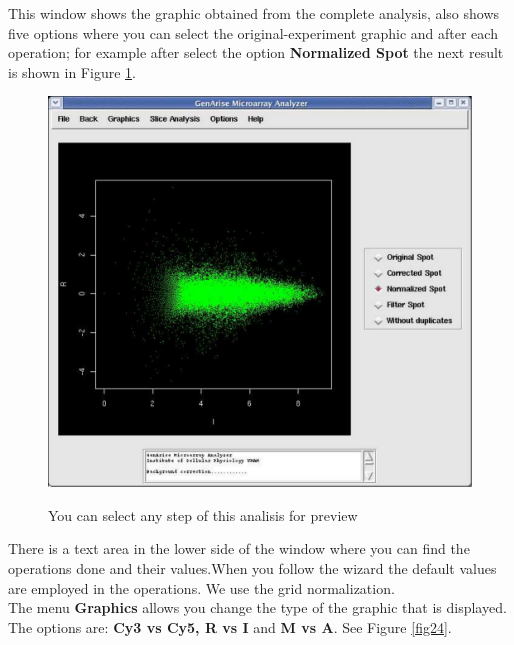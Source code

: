 \documentclass[12pt]{article}
\begin{document}
This window shows the graphic obtained from the complete analysis, also shows five options where you can select the original-experiment graphic and after each operation; for example after select the option \textbf{Normalized Spot} the next result is shown in Figure \ref{fig23}.\\
\begin{figure}[h]
\begin{center}
\includegraphics[scale= 0.3]{./images/wizardNorm.pdf}\\
\caption{You can select any step of this analisis for preview \label{fig23}}
\end{center}
\end{figure}

There is a text area in the lower side of the window where you can find the operations done and their values.When you follow the wizard the default values are employed in the operations. We use the grid normalization.\\
The menu \textbf{Graphics} allows you change the type of the graphic that is displayed. The options are:  \textbf{Cy3 vs Cy5, R vs I } and \textbf{M vs A}. See Figure \ref{fig24}.\\
\end{document}
